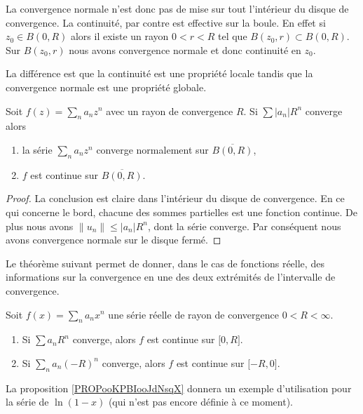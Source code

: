 La convergence normale n'est donc pas de mise sur tout l'intérieur du disque de convergence. La continuité, par contre est effective sur la boule. En effet si \( z_0\in B(0,R)\) alors il existe un rayon \( 0<r<R\) tel que \( B(z_0,r)\subset B(0,R)\). Sur \( B(z_0,r)\) nous avons convergence normale et donc continuité en \( z_0\).

La différence est que la continuité est une propriété locale tandis que la convergence normale est une propriété globale.

\begin{proposition}
    Soit \( f(z)=\sum_na_nz^n\) avec un rayon de convergence \( R\). Si \( \sum | a_n |R^n\) converge alors
    \begin{enumerate}
        \item
            la série \( \sum_na_nz^n\) converge normalement sur \( \overline{ B(0,R) }\),
        \item
            \( f\) est continue sur \( \overline{ B(0,R) }\).
    \end{enumerate}
\end{proposition}

\begin{proof}
    La conclusion est claire dans l'intérieur du disque de convergence. En ce qui concerne le bord, chacune des sommes partielles est une fonction continue. De plus nous avons \( \| u_n \|\leq | a_n |R^n\), dont la série converge. Par conséquent nous avons convergence normale sur le disque fermé.
\end{proof}

Le théorème suivant permet de donner, dans le cas de fonctions réelle, des informations sur la convergence en une des deux extrémités de l'intervalle de convergence.
\begin{theorem} \label{ThoLUXVjs}
    Soit \( f(x)=\sum_na_nx^n\) une série réelle de rayon de convergence \( 0<R<\infty\).
    \begin{enumerate}
        \item
            Si \( \sum a_nR^n\) converge, alors \( f\) est continue sur \( \mathopen[ 0 , R \mathclose]\).
        \item
            Si \( \sum_na_n(-R)^n\) converge, alors \( f\) est continue sur \( \mathopen[ -R , 0 \mathclose]\).
    \end{enumerate}
\end{theorem}

La proposition \ref{PROPooKPBIooJdNsqX} donnera un exemple d'utilisation pour la série de \( \ln(1-x)\) (qui n'est pas encore définie à ce moment).


